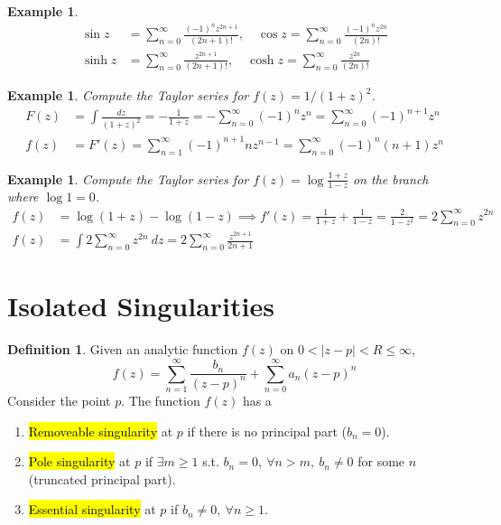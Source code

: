 \documentclass{article}
\newtheorem{example}[theorem]{Example}
\theoremstyle{definition}
\newtheorem{definition}{Definition}[section]
\begin{document}
\begin{example} \normalfont \vspace{-1em}
    \begin{align*}
        \sin z &= \sum_{n=0}^\infty \frac{(-1)^n z^{2n+1}}{(2n+1)!}, \quad \cos z = \sum_{n=0}^\infty \frac{(-1)^n z^{2n}}{(2n)!} \\
        \sinh z &= \sum_{n=0}^\infty \frac{z^{2n+1}}{(2n+1)!}, \quad \cosh z = \sum_{n=0}^\infty \frac{z^{2n}}{(2n)!}
    \end{align*}
\end{example}

\begin{example} \normalfont
    Compute the Taylor series for $f(z) = 1/(1+z)^2$.
    \begin{align*}
        F(z) &= \int \frac{dz}{(1+z)^2} = -\frac{1}{1+z} = - \sum_{n=0}^\infty (-1)^n z^n = \sum_{n=0}^\infty (-1)^{n+1} z^n \\
        f(z) &= F'(z) = \sum_{n=1}^\infty (-1)^{n+1} n z^{n-1} = \sum_{n=0}^\infty (-1)^n (n+1) z^n
    \end{align*}
\end{example}

\begin{example} \normalfont
    Compute the Taylor series for $f(z) = \log \frac{1+z}{1-z}$ on the branch where $\log 1 = 0$.
    \begin{align*}
        f(z) &= \log(1+z) - \log(1-z) \implies f'(z) = \frac{1}{1+z} + \frac{1}{1-z} = \frac{2}{1-z^2} = 2 \sum_{n=0}^\infty z^{2n} \\
        f(z) &= \int 2 \sum_{n=0}^\infty z^{2n}\ dz = 2 \sum_{n=0}^\infty \frac{z^{2n+1}}{2n+1}
    \end{align*}
\end{example}


\section{Isolated Singularities}

\begin{definition}
    Given an analytic function $f(z)$ on $0 < |z-p| < R \leq \infty$,
    \begin{equation*}
        f(z) = \sum_{n=1}^\infty \frac{b_n}{(z-p)^n} + \sum_{n=0}^\infty a_n (z-p)^n
    \end{equation*}
    Consider the point $p$. The function $f(z)$ has a
    \begin{enumerate}
        \item \hl{Removeable singularity} at $p$ if there is no principal part ($b_n = 0$).
        \item \hl{Pole singularity} at $p$ if $\exists m \geq 1$ s.t. $b_n = 0,\ \forall n > m,\ b_n \neq 0$ for some $n$ (truncated principal part).
        \item \hl{Essential singularity} at $p$ if $b_n \neq 0,\ \forall n \geq 1$.
    \end{enumerate}
\end{definition}
\end{document}
